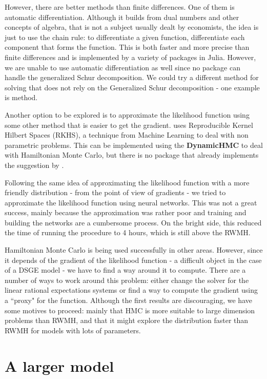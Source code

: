 \documentclass[12pt,a4paper]{article}
\begin{document}
However, there are better methods than finite differences. One of them is automatic differentiation. Although it builds from dual numbers and other concepts of algebra, that is not a subject usually dealt by economists, the idea is just to use the chain rule: to differentiate a given function, differentiate each component that forms the function. This is both faster and more precise than finite differences and is implemented by a variety of packages in Julia. However, we are unable to use automatic differentiation as well since no package can handle the generalized Schur decomposition. We could try a different method for solving that does not rely on the Generalized Schur decomposition - one example is \cite{anderson1985} method. 

Another option to be explored is to approximate the likelihood function using some other method that is easier to get the gradient. \cite{Strathmann2015a} uses Reproducible Kernel Hilbert Spaces (RKHS), a technique from Machine Learning to deal with non parametric problems. This can be implemented using the \textbf{DynamicHMC} to deal with Hamiltonian Monte Carlo, but there is no package that already implements the suggestion by \cite{Strathmann2015a}. 

Following the same idea of approximating the likelihood function with a more friendly distribution - from the point of view of gradients - we tried to approximate the likelihood function using neural networks. This was not a great success, mainly because the approximation was rather poor and training and building the networks are a cumbersome process. On the bright side, this reduced the time of running the procedure to 4 hours, which is still above the RWMH.

Hamiltonian Monte Carlo is being used successfully in other areas. However, since it depends of the gradient of the likelihood function  - a difficult object in the case of a DSGE model - we have to find a way around it to compute. There are a number of ways to work around this problem: either change the solver for the linear rational expectations systems or find a way to compute the gradient using a ``proxy" for the function. Although the first results are discouraging, we have some motives to proceed: mainly that HMC is more suitable to large dimension problems than RWMH, and that it might explore the distribution faster than RWMH for models with lots of parameters.   

\section{A larger model}
\end{document}
